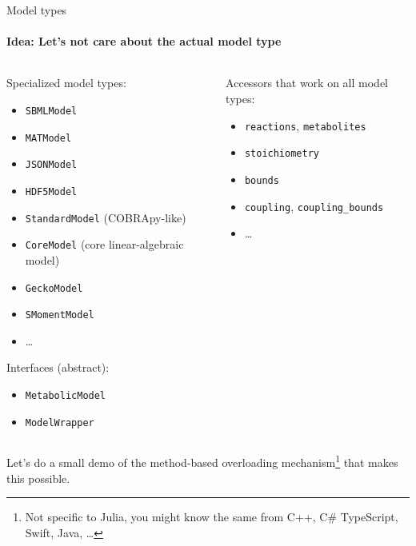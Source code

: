 \documentclass[aspectratio=169]{beamer}
\begin{document}
\begin{frame}[fragile]{Model types}
\framesubtitle{Idea: Let's not care about the actual model type}
\begin{columns}
\begin{column}{.5\linewidth}
Specialized model types:

\begin{itemize}\tiny
\item \verb|SBMLModel|
\item \verb|MATModel|
\item \verb|JSONModel|
\item \verb|HDF5Model|
\item \verb|StandardModel| (COBRApy-like)
\item \verb|CoreModel| (core linear-algebraic model)
\item \verb|GeckoModel|
\item \verb|SMomentModel|
\item \dots
\end{itemize}

Interfaces (abstract):
\begin{itemize}\footnotesize
\item \verb|MetabolicModel|
\item \verb|ModelWrapper|
\end{itemize}
\end{column}
\begin{column}{.5\linewidth}
Accessors that work on all model types:
\begin{itemize}\footnotesize
\item \verb|reactions|, \verb|metabolites|
\item \verb|stoichiometry|
\item \verb|bounds|
\item \verb|coupling|, \verb|coupling_bounds|
\item \dots
\end{itemize}
\end{column}
\end{columns}
\end{frame}

\begin{frame}[standout]
Let's do a small demo of the method-based overloading mechanism\footnote{Not specific to Julia, you might know the same from C++, C\# TypeScript, Swift, Java, \dots} that makes this possible.
\end{frame}
\end{document}
